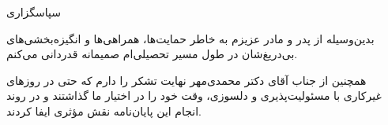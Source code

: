 \thispagestyle{empty}

{\nas
سپاسگزاری
}

بدین‌وسیله از پدر و مادر عزیزم به خاطر حمایت‌ها، همراهی‌ها و انگیزه‌بخشی‌های بی‌دریغ‌شان در طول مسیر تحصیلی‌ام صمیمانه قدردانی می‌کنم.

همچنین از جناب آقای دکتر محمدی‌مهر نهایت تشکر را دارم که حتی در روزهای غیرکاری با مسئولیت‌پذیری و دلسوزی، وقت خود را در اختیار ما گذاشتند و در روند انجام این پایان‌نامه نقش مؤثری ایفا کردند.

\begin{flushleft}
\text{
\QstudentName
}\\
\text{
\QdefData
}
\end{flushleft}
